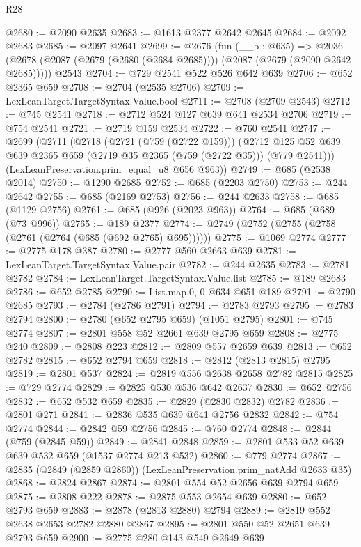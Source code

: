\begin{lexlean}{R28}
\begin{coremodule}
@2680 := @2090 @2635
@2683 := @1613 @2377 @2642 @2645
@2684 := @2092 @2683
@2685 := @2097 @2641
@2699 := @2676
    (fun (__b : @635) =>
    @2036 (@2678 (@2087 (@2679 (@2680 (@2684 @2685)))) (@2087 (@2679 (@2090 @2642 @2685)))))
    @2543
@2704 := @729 @2541 @522 @526 @642 @639
@2706 := @652 @2365 @659
@2708 := @2704 (@2535 @2706)
@2709 := LexLeanTarget.TargetSyntax.Value.bool
@2711 := @2708 (@2709 @2543)
@2712 := @745 @2541
@2718 := @2712 @524 @127 @639 @641 @2534 @2706
@2719 := @754 @2541
@2721 := @2719 @159 @2534
@2722 := @760 @2541
@2747 := @2699
    (@2711
      (@2718
        (@2721 (@759 (@2722 @159)))
        (@2712 @125 @52 @639 @639 @2365 @659 (@2719 @35 @2365 (@759 (@2722 @35))) (@779 @2541)))
      (LexLeanPreservation.prim_equal_u8 @656 @963))
@2749 := @685 (@2538 @2014)
@2750 := @1290 @2685
@2752 := @685 (@2203 @2750)
@2753 := @244 @2642
@2755 := @685 (@2169 @2753)
@2756 := @244 @2633
@2758 := @685 (@1129 @2756)
@2761 := @685 (@926 (@2023 @963))
@2764 := @685 (@689 (@73 @996))
@2765 := @189 @2377
@2774 := @2749 (@2752 (@2755 (@2758 (@2761 (@2764 (@685 (@692 @2765) @695))))))
@2775 := @1069 @2774
@2777 := @2775 @178 @387
@2780 := @2777 @560 @2663 @639
@2781 := LexLeanTarget.TargetSyntax.Value.pair
@2782 := @244 @2635
@2783 := @2781 @2782
@2784 := LexLeanTarget.TargetSyntax.Value.list
@2785 := @189 @2683
@2786 := @652 @2785
@2790 := List.map.{0, 0} @634 @651 @189
@2791 := @2790 @2685
@2793 := @2784 (@2786 @2791)
@2794 := @2783 @2793
@2795 := @2783 @2794
@2800 := @2780 (@652 @2795 @659) (@1051 @2795)
@2801 := @745 @2774
@2807 := @2801 @558 @52 @2661 @639 @2795 @659
@2808 := @2775 @240
@2809 := @2808 @223
@2812 := @2809 @557 @2659 @639
@2813 := @652 @2782
@2815 := @652 @2794 @659
@2818 := @2812 (@2813 @2815) @2795
@2819 := @2801 @537
@2824 := @2819 @556 @2638 @2658 @2782 @2815
@2825 := @729 @2774
@2829 := @2825 @530 @536 @642 @2637
@2830 := @652 @2756
@2832 := @652 @532 @659
@2835 := @2829 (@2830 @2832) @2782
@2836 := @2801 @271
@2841 := @2836 @535 @639 @641 @2756 @2832
@2842 := @754 @2774
@2844 := @2842 @59 @2756
@2845 := @760 @2774
@2848 := @2844 (@759 (@2845 @59))
@2849 := @2841 @2848
@2859 := @2801 @533 @52 @639 @639 @532 @659 (@1537 @2774 @213 @532)
@2860 := @779 @2774
@2867 := @2835 (@2849 (@2859 @2860)) (LexLeanPreservation.prim_natAdd @2633 @35)
@2868 := @2824 @2867
@2874 := @2801 @554 @52 @2656 @639 @2794 @659
@2875 := @2808 @222
@2878 := @2875 @553 @2654 @639
@2880 := @652 @2793 @659
@2883 := @2878 (@2813 @2880) @2794
@2889 := @2819 @552 @2638 @2653 @2782 @2880 @2867
@2895 := @2801 @550 @52 @2651 @639 @2793 @659
@2900 := @2775 @280 @143 @549 @2649 @639

\end{coremodule}
\end{lexlean}
